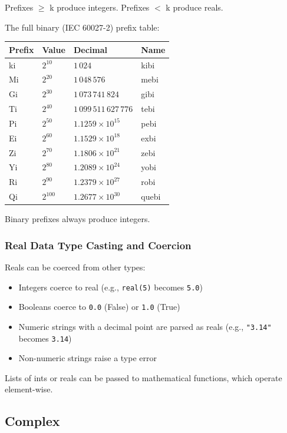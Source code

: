 Prefixes $\geq$ k produce integers. Prefixes $<$ k produce reals.

The full binary (IEC 60027-2) prefix table:
\begin{center}
\begin{tabular}{llll}
\hline
Prefix & Value & Decimal & Name \\
\hline
ki & $2^{10}$  & $1\,024$                    & kibi  \\
Mi & $2^{20}$  & $1\,048\,576$               & mebi  \\
Gi & $2^{30}$  & $1\,073\,741\,824$          & gibi  \\
Ti & $2^{40}$  & $1\,099\,511\,627\,776$     & tebi  \\
Pi & $2^{50}$  & $1.1259 \times 10^{15}$     & pebi  \\
Ei & $2^{60}$  & $1.1529 \times 10^{18}$     & exbi  \\
Zi & $2^{70}$  & $1.1806 \times 10^{21}$     & zebi  \\
Yi & $2^{80}$  & $1.2089 \times 10^{24}$     & yobi  \\
Ri & $2^{90}$  & $1.2379 \times 10^{27}$     & robi  \\
Qi & $2^{100}$ & $1.2677 \times 10^{30}$     & quebi \\
\hline
\end{tabular}
\end{center}

Binary prefixes always produce integers.

\subsubsection{Real Data Type Casting and Coercion}
Reals can be coerced from other types:
\begin{itemize}
\item Integers coerce to real (e.g., \texttt{real(5)} becomes \texttt{5.0})
\item Booleans coerce to \texttt{0.0} (False) or \texttt{1.0} (True)
\item Numeric strings with a decimal point are parsed as reals (e.g., \texttt{"3.14"} becomes \texttt{3.14})
\item Non-numeric strings raise a type error
\end{itemize}
Lists of ints or reals can be passed to mathematical functions, which operate element-wise.
\subsection{Complex}
